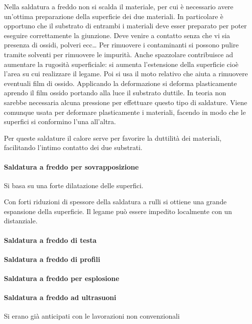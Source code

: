 Nella saldatura a freddo non si scalda il materiale, per cui è necessario avere un'ottima preparazione della superficie dei due materiali.
In particolare è opportuno che il substrato di entrambi i materiali deve esser preparato per poter eseguire correttamente la giunzione.
Deve venire a contatto senza che vi sia presenza di ossidi, polveri ecc\dots
Per rimuovere i contaminanti si possono pulire tramite solventi per rimuovere le impurità. Anche spazzolare contribuisce ad aumentare la rugosità superficiale: si aumenta l'estensione della superficie cioè l'area su cui realizzare il legame.
Poi si usa il moto relativo che aiuta a rimuovere eventuali film di ossido.
Applicando la deformazione si deforma plasticamente aprendo il film ossido portando alla luce il substrato duttile.
In teoria non sarebbe necessaria alcuna pressione per effettuare questo tipo di saldature. Viene comunque usata per deformare plasticamente i materiali, facendo in modo che le superfici si conformino l'una all'altra.

Per queste saldature il calore serve per favorire la duttilità dei materiali, facilitando l'intimo contatto dei due substrati.

\paragraph{Saldatura a freddo per sovrapposizione}
Si basa su una forte dilatazione delle superfici.

Con forti riduzioni di spessore della saldatura a rulli si ottiene una grande espansione della superficie.
Il legame può essere impedito localmente con un distanziale.

\paragraph{Saldatura a freddo di testa}
\paragraph{Saldatura a freddo di profili}
\paragraph{Saldatura a freddo per esplosione}
\paragraph{Saldatura a freddo ad ultrasuoni}
Si erano già anticipati con le lavorazioni non convenzionali

